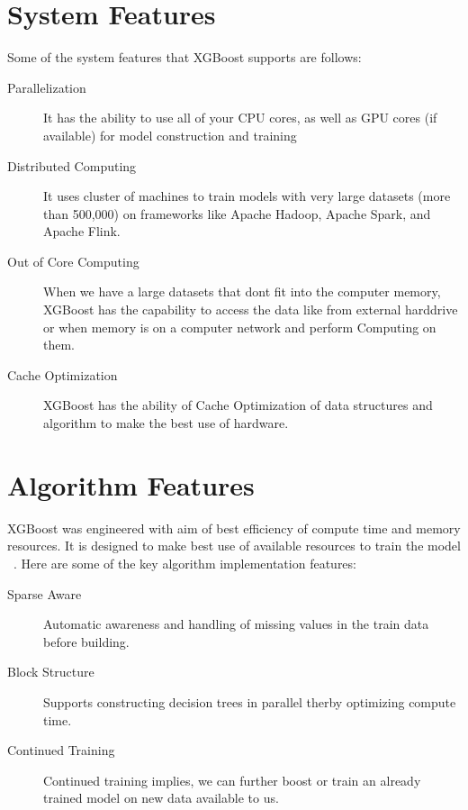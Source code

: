 \section{System Features} 

Some of the system features that XGBoost supports are follows: 

\begin{description}
\item[Parallelization]

It has the ability to use all of your CPU cores, as well as GPU cores (if
available) for model construction and training

\item[Distributed Computing]

It uses cluster of machines to train models with very large datasets (more than
500,000) on frameworks like Apache Hadoop, Apache Spark, and Apache Flink.

\item[Out of Core Computing]

When we have a large datasets that dont fit into the computer memory, XGBoost
has the capability to access the data  like from external harddrive or when
memory is on a computer network and perform Computing on them.

\item[Cache Optimization]

XGBoost has the ability of Cache Optimization of data structures and algorithm
to make the best use of hardware.

\end{description}


\section{Algorithm Features} 

XGBoost was engineered with aim of best efficiency of compute time and memory
resources. It is designed to make best use of available resources to train the
model ~\cite{hid-sp18-401-XGBoost-MLmastery}. Here are some of the key algorithm
implementation features:

\begin{description}

\item[Sparse Aware]

Automatic awareness and handling of missing values in the train data before 
building.

\item[Block Structure]

Supports constructing decision trees in parallel therby optimizing compute time.

\item[Continued Training] 

Continued training implies, we can further boost or train an already trained
model on new data available to us.

\end{description}



